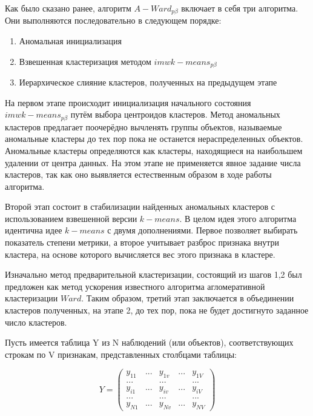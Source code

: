 \documentclass[12pt,twoside,a4paper,tikz,border=5]{refart}
\begin{document}
			Как было сказано ранее, алгоритм $ A-Ward_{p\beta} $ включает в себя три алгоритма. Они выполняются последовательно в следующем порядке:
			\begin{enumerate}
				\item Аномальная инициализация 
				\item Взвешенная кластеризация методом $ imwk-means_{p\beta}$
				\item Иерархическое слияние кластеров, полученных на предыдущем этапе
			\end{enumerate}
			На первом этапе происходит инициализация начального состояния  $ imwk-means_{p\beta}$ путём выбора центроидов кластеров. Метод аномальных кластеров предлагает поочерёдно вычленять группы объектов, называемые аномальные кластеры до тех пор пока не останется нераспределенных объектов. Аномальные кластеры определяются как кластеры, находящиеся на наибольшем удалении от центра данных. На этом этапе не применяется явное задание числа кластеров, так как оно выявляется естественным образом в ходе работы алгоритма. 
			
			Второй этап состоит в стабилизации найденных аномальных кластеров с использованием взвешенной версии $ k-means $. В целом идея этого алгоритма идентична идее $ k-means $ с двумя дополнениями. Первое позволяет выбирать показатель степени метрики, а второе учитывает разброс признака внутри кластера, на основе которого вычисляется вес этого признака в кластере.
			 
			Изначально метод предварительной кластеризации, состоящий из шагов 1,2 был предложен как метод ускорения известного алгоритма агломеративной кластеризации $ Ward $. Таким образом, третий этап заключается в объединении кластеров полученных, на этапе 2, до тех пор, пока не будет достигнуто заданное число кластеров.
			
			Пусть имеется таблица Y из N наблюдений (или объектов), соответствующих строкам по V признакам, представленных столбцами таблицы:
			
			\begin{equation}
				Y = \begin{pmatrix}
				y_{11} & ... & y_{1v} & ... & y_{1V} \\ 
				... &  & ... & &... \\ 
				y_{i1} & ... & y_{iv} & ... & y_{iV} \\ 
				... &  & ... & &... \\ 
				y_{N1} & ... & y_{Nv} & ... & y_{NV}
				\end{pmatrix}
			\end{equation}
\end{document}
